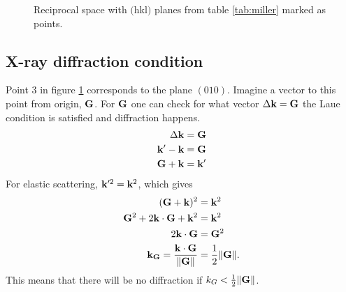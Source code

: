 \documentclass[10pt, a4paper]{amsart}
\begin{document}
\begin{figure}[ht]
	\centering
	\caption{Reciprocal space with $($hkl$)$ planes from table \ref{tab:miller} marked as points.}
	\label{fig:reciprocal}	
\end{figure}

\subsection{X-ray diffraction condition}
Point $3$ in figure \ref{fig:reciprocal} corresponds to the plane $(010)$. Imagine a vector to this point from origin, $\vb{G}$. For $\vb{G}$ one can check for what vector $\Delta \vb{k} = \vb{G}$ the Laue condition is satisfied and diffraction happens.
\begin{align*}
\Delta \vb{k} &= \vb{G} \\
\vb{k}' - \vb{k} &= \vb{G} \\
\vb{G} + \vb{k} &= \vb{k}' \\
\end{align*}
For elastic scattering, $\vb{k}'^2 = \vb{k}^2$, which gives
\begin{align*}
(\vb{G} + \vb{k})^2 &= \vb{k}^2 \\
\vb{G}^2 + 2\vb{k} \cdot \vb{G} + \vb{k}^2 &= \vb{k}^2  \\
2\vb{k} \cdot \vb{G} &= \vb{G}^2 \\
\vb{k_G} = \frac{\vb{k}\cdot\vb{G}}{\norm{\vb{G}}} &= \frac{1}{2} \norm{\vb{G}}.
\end{align*}
This means that there will be no diffraction if $k_G < \frac{1}{2} \norm{\vb{G}}$.
\end{document}

